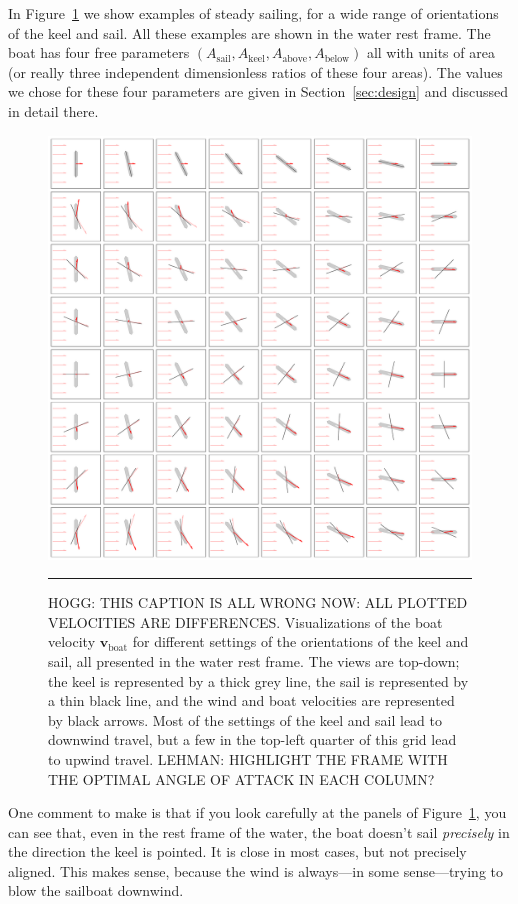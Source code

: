 \documentclass[letterpaper]{article}
\renewcommand{\vec}[1]{\boldsymbol{#1}}
\newcommand{\boat}{\text{boat}}
\newcommand{\sail}{\text{sail}}
\newcommand{\keel}{\text{keel}}
\renewcommand{\above}{\text{above}}
\newcommand{\below}{\text{below}}
\newcommand{\vboat}{\vec{v}_\boat}
\newcommand{\secref}[1]{Section~\ref{#1}}
\newcommand{\figref}[1]{Figure~\ref{#1}}
\newcommand{\figurerule}{\rule[1ex]{\textwidth}{0.2pt}}
\begin{document}
In \figref{fig:steady} we show examples of steady sailing, for a wide range of orientations of the keel and sail.
All these examples are shown in the water rest frame.
The boat has four free parameters $(A_\sail,A_\keel,A_{\above},A_{\below})$ all with units of area (or really three independent dimensionless ratios of these four areas).
The values we chose for these four parameters are given in \secref{sec:design} and discussed in detail there.
\begin{figure}[t!]
  \includegraphics[width=\textwidth]{steady.pdf}
  \caption{HOGG: THIS CAPTION IS ALL WRONG NOW: ALL PLOTTED VELOCITIES ARE DIFFERENCES. Visualizations of the boat velocity $\vboat$ for different settings of the orientations of the keel and sail, all presented in the water rest frame.
  The views are top-down; the keel is represented by a thick grey line, the sail is represented by a thin black line, and the wind and boat velocities are represented by black arrows.
  Most of the settings of the keel and sail lead to downwind travel, but a few in the top-left quarter of this grid lead to upwind travel. LEHMAN: HIGHLIGHT THE FRAME WITH THE OPTIMAL ANGLE OF ATTACK IN EACH COLUMN?\label{fig:steady}}
  \figurerule
\end{figure}

One comment to make is that if you look carefully at the panels of \figref{fig:steady}, you can see that, even in the rest frame of the water, the boat doesn't sail \emph{precisely} in the direction the keel is pointed.
It is close in most cases, but not precisely aligned.
This makes sense, because the wind is always---in some sense---trying to blow the sailboat downwind.
\end{document}
